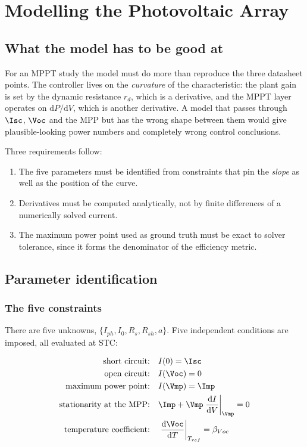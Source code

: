 \chapter{Modelling the Photovoltaic Array}
\label{ch:pvmodel}

\section{What the model has to be good at}

For an MPPT study the model must do more than reproduce the three datasheet
points. The controller lives on the \emph{curvature} of the characteristic: the
plant gain is set by the dynamic resistance $r_d$, which is a derivative, and
the MPPT layer operates on $\mathrm{d}P/\mathrm{d}V$, which is another
derivative. A model that passes through $\Isc$, $\Voc$ and the MPP but has the
wrong shape between them would give plausible-looking power numbers and
completely wrong control conclusions.

Three requirements follow:

\begin{enumerate}[leftmargin=1.6em]
  \item The five parameters must be identified from constraints that pin the
        \emph{slope} as well as the position of the curve.
  \item Derivatives must be computed analytically, not by finite differences of
        a numerically solved current.
  \item The maximum power point used as ground truth must be exact to solver
        tolerance, since it forms the denominator of the efficiency metric.
\end{enumerate}

\section{Parameter identification}

\subsection{The five constraints}

There are five unknowns, $\{I_{ph}, I_0, R_s, R_{sh}, a\}$. Five independent
conditions are imposed, all evaluated at STC:

\begin{align}
\text{short circuit:} \quad & I(0) = \Isc \label{eq:c1}\\
\text{open circuit:} \quad & I(\Voc) = 0 \label{eq:c2}\\
\text{maximum power point:} \quad & I(\Vmp) = \Imp \label{eq:c3}\\
\text{stationarity at the MPP:} \quad & \Imp + \Vmp \left.\frac{\mathrm{d}I}{\mathrm{d}V}\right|_{\Vmp} = 0 \label{eq:c4}\\
\text{temperature coefficient:} \quad & \left.\frac{\mathrm{d}\Voc}{\mathrm{d}T}\right|_{T_{ref}} = \beta_{Voc} \label{eq:c5}
\end{align}

